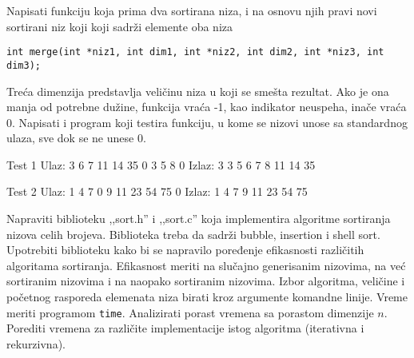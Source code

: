 \begin{Exercise}[label=505]
  Napisati funkciju koja prima dva sortirana niza, i na osnovu
  njih pravi novi sortirani niz koji koji sadrži elemente oba niza
\begin{verbatim}
int merge(int *niz1, int dim1, int *niz2, int dim2, int *niz3, int dim3);
\end{verbatim}
Treća dimenzija predstavlja veličinu niza u koji se smešta
rezultat. Ako je ona manja od potrebne dužine, funkcija vraća
-1, kao indikator neuspeha, inače vraća 0. Napisati i program
koji testira funkciju, u kome se nizovi unose sa standardnog ulaza,
sve dok se ne unese 0.
  
\begin{miditest}
\begin{test}{Test 1}
Ulaz:   3 6 7 11 14 35 0 3 5 8 0
Izlaz:  3 3 5 6 7 8 11 14 35
\end{test}
\end{miditest}

\begin{miditest}
\begin{test}{Test 2}
Ulaz:   1 4 7 0 9 11 23 54 75 0
Izlaz:  1 4 7 9 11 23 54 75
\end{test}
\end{miditest}
  
\end{Exercise}

\begin{Exercise}[label=506]
  Napraviti biblioteku ,,sort.h'' i ,,sort.c'' koja implementira
  algoritme sortiranja nizova celih brojeva. Biblioteka treba da
  sadrži bubble, insertion i shell sort. Upotrebiti biblioteku kako
  bi se napravilo poređenje efikasnosti različitih algoritama
  sortiranja. Efikasnost meriti na slučajno generisanim nizovima,
  na već sortiranim nizovima i na naopako sortiranim
  nizovima. Izbor algoritma, veličine i početnog rasporeda
  elemenata niza birati kroz argumente komandne linije.  Vreme meriti
  programom \verb|time|. Analizirati porast vremena sa porastom
  dimenzije $n$. Porediti vremena za različite implementacije istog
  algoritma (iterativna i rekurzivna).  
  
\end{Exercise}

